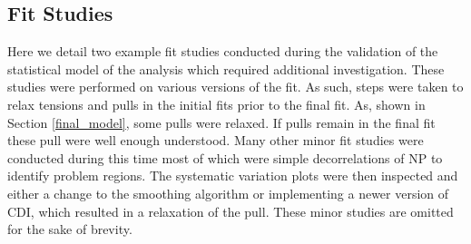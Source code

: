 \subsection{Fit Studies}
Here we detail two example fit studies conducted during the validation of the statistical model of the analysis which required additional investigation. These studies were performed on various versions of the fit. As such, steps were taken to relax tensions and pulls in the initial fits prior to the final fit. As, shown in Section \ref{final_model}, some pulls were relaxed. If pulls remain in the final fit these pull were well enough understood. Many other minor fit studies were conducted during this time most of which were simple decorrelations of NP to identify problem regions. The systematic variation plots were then inspected and either a change to the smoothing algorithm or implementing a newer version of CDI, which resulted in a relaxation of the pull. These minor studies are omitted for the sake of brevity.
